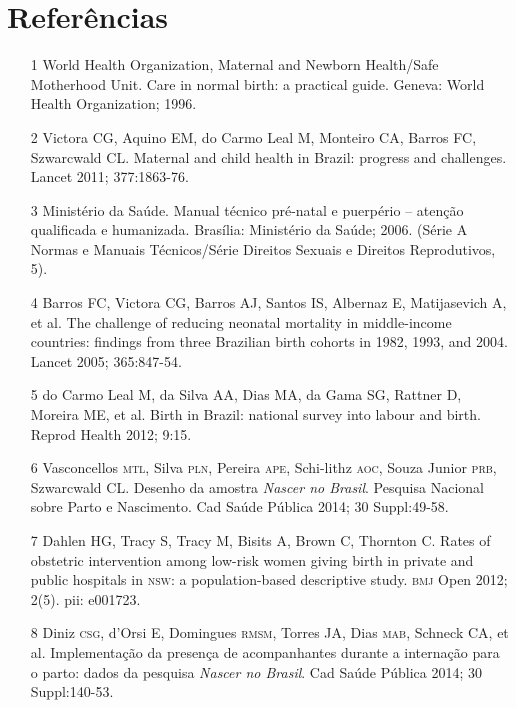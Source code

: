 \documentclass{article}
\begin{document}
\section*{Referências}
\begin{itemize}

\item[1] World Health Organization, Maternal and Newborn Health/Safe
Motherhood Unit. Care in normal birth: a practical guide. Geneva: World Health
Organization; 1996.

\item[2] Victora CG, Aquino EM, do Carmo Leal M, Monteiro CA, Barros FC,
Szwarcwald CL. Maternal and child health in Brazil: progress and challenges.
Lancet 2011; 377:1863-76.

\item[3] Ministério da Saúde. Manual técnico pré-natal e puerpério – atenção
qualificada e humanizada. Brasília: Ministério da Saúde; 2006. (Série A Normas e
Manuais Técnicos/Série Direitos Sexuais e Direitos Reprodutivos,
5).

\item[4] Barros FC, Victora CG, Barros AJ, Santos IS, Albernaz E,
Matijasevich A, et al. The challenge of reducing neonatal mortality in
middle-income countries: findings from three Brazilian birth cohorts in 1982,
1993, and 2004. Lancet 2005; 365:847-54.

\item[5] do Carmo Leal M, da Silva AA, Dias MA, da Gama SG, Rattner D,
Moreira ME, et al. Birth in Brazil: national survey into labour and birth.
Reprod Health 2012; 9:15.

\item[6] Vasconcellos \textsc{mtl}, Silva \textsc{pln}, Pereira \textsc{ape}, Schi-lithz \textsc{aoc}, Souza
Junior \textsc{prb}, Szwarcwald CL. Desenho da amostra \textit{Nascer no Brasil}.
Pesquisa Nacional sobre Parto e Nascimento. Cad Saúde Pública 2014; 30
Suppl:49-58.

\item[7] Dahlen HG, Tracy S, Tracy M, Bisits A, Brown C, Thornton C. Rates
of obstetric intervention among low-risk women giving birth in private and
public hospitals in \textsc{nsw}: a population-based descriptive study. \textsc{bmj} Open 2012;
2(5). pii: e001723.

\item[8] Diniz \textsc{csg}, d’Orsi E, Domingues \textsc{rmsm}, Torres JA, Dias \textsc{mab}, Schneck
CA, et al. Implementação da presença de acompanhantes durante a internação para
o parto: dados da pesquisa \textit{Nascer no Brasil}. Cad Saúde Pública
2014; 30 Suppl:140-53.


\end{itemize}
\end{document}
